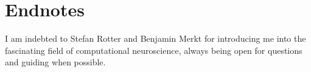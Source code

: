 \section{Endnotes}
\label{sec:endnotes}
I am indebted to Stefan Rotter and Benjamin Merkt for introducing 
me into the fascinating field of computational neuroscience, always
being open for questions and guiding when possible. 

